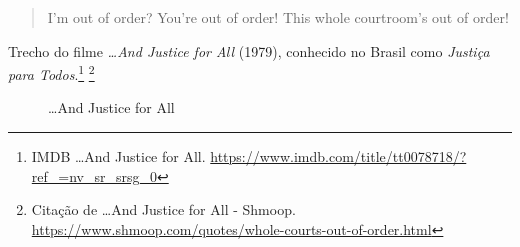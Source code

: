 \saveparinfos
\noindent
\begin{minipage}[c]{0.5\textwidth}\useparinfo

\begin{quote}
I'm out of order? You're out of order! This whole courtroom's out of
order!
\end{quote}

Trecho do filme \emph{\ldots And Justice for All} (1979), conhecido no
Brasil como \emph{Justiça para Todos}.\footnote{\sloppy IMDB …And Justice for All. \url{https://www.imdb.com/title/tt0078718/?ref_=nv_sr_srsg_0}}
\footnote{\sloppy Citação de …And Justice for All - Shmoop. \url{https://www.shmoop.com/quotes/whole-courts-out-of-order.html}}

\end{minipage}\hfill
\begin{minipage}[c]{0.5\textwidth}

\begin{figure}
  \centering
    \caption{…And Justice for All\label{fig:and-justice-for-all}}
\end{figure}

\end{minipage}

